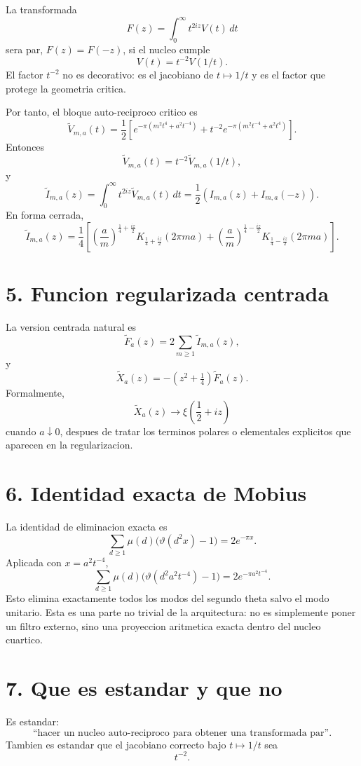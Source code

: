 \documentclass[11pt]{article}
\begin{document}
La transformada
\[
F(z)=\int_0^\infty t^{2iz}V(t)\,dt
\]
sera par, \(F(z)=F(-z)\), si el nucleo cumple
\[
V(t)=t^{-2}V(1/t).
\]
El factor \(t^{-2}\) no es decorativo: es el jacobiano de \(t\mapsto1/t\) y
es el factor que protege la geometria critica.

Por tanto, el bloque auto-reciproco critico es
\[
\widetilde V_{m,a}(t)
=
\frac12\left[
e^{-\pi(m^2t^4+a^2t^{-4})}
+
t^{-2}e^{-\pi(m^2t^{-4}+a^2t^4)}
\right].
\]
Entonces
\[
\widetilde V_{m,a}(t)=t^{-2}\widetilde V_{m,a}(1/t),
\]
y
\[
\widetilde I_{m,a}(z)
=
\int_0^\infty t^{2iz}\widetilde V_{m,a}(t)\,dt
=
\frac12\left(I_{m,a}(z)+I_{m,a}(-z)\right).
\]
En forma cerrada,
\[
\widetilde I_{m,a}(z)
=
\frac14\left[
\left(\frac{a}{m}\right)^{\frac14+\frac{iz}{2}}
K_{\frac14+\frac{iz}{2}}(2\pi ma)
+
\left(\frac{a}{m}\right)^{\frac14-\frac{iz}{2}}
K_{\frac14-\frac{iz}{2}}(2\pi ma)
\right].
\]

\section*{5. Funcion regularizada centrada}

La version centrada natural es
\[
\widetilde F_a(z)=2\sum_{m\ge1}\widetilde I_{m,a}(z),
\]
y
\[
\widetilde X_a(z)
=
-(z^2+\tfrac14)\widetilde F_a(z).
\]
Formalmente,
\[
\widetilde X_a(z)\longrightarrow \xi\left(\frac12+iz\right)
\]
cuando \(a\downarrow0\), despues de tratar los terminos polares o
elementales explicitos que aparecen en la regularizacion.

\section*{6. Identidad exacta de Mobius}

La identidad de eliminacion exacta es
\[
\sum_{d\ge1}\mu(d)\bigl(\vartheta(d^2x)-1\bigr)
=2e^{-\pi x}.
\]
Aplicada con \(x=a^2t^{-4}\),
\[
\boxed{
\sum_{d\ge1}\mu(d)
\bigl(\vartheta(d^2a^2t^{-4})-1\bigr)
=
2e^{-\pi a^2t^{-4}}.
}
\]
Esto elimina exactamente todos los modos del segundo theta salvo el modo
unitario. Esta es una parte no trivial de la arquitectura: no es simplemente
poner un filtro externo, sino una proyeccion aritmetica exacta dentro del
nucleo cuartico.

\section*{7. Que es estandar y que no}

Es estandar:
\[
\text{``hacer un nucleo auto-reciproco para obtener una transformada par''.}
\]
Tambien es estandar que el jacobiano correcto bajo \(t\mapsto1/t\) sea
\[
t^{-2}.
\]
\end{document}
